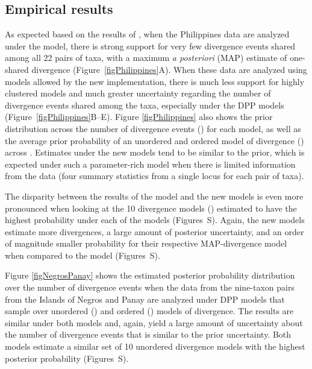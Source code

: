 \subsection{Empirical results}
As expected based on the results of \cite{Oaks2012}, when the Philippines data
are analyzed under the \empModelOld model, there is strong support for very few
divergence events shared among all 22 pairs of taxa, with a maximum \emph{a
posteriori} (MAP) estimate of one-shared divergence
(Figure~\ref{figPhilippines}A).
When these data are analyzed using models allowed by the new implementation,
there is much less support for highly clustered models and much greater
uncertainty regarding the number of divergence events shared among the taxa,
especially under the DPP models (Figure~\ref{figPhilippines}B--E).
Figure \ref{figPhilippines} also shows the prior distribution across the number
of divergence events (\divTimeNum) for each model, as well as the
average prior probability of an unordered and ordered model of divergence
(\divTimeIndexVector) across \divTimeNum.
Estimates under the new models tend to be similar to the prior, which is
expected under such a parameter-rich model when there is limited information
from the data (four summary statistics from a single locus for each pair of
taxa).

The disparity between the results of the \empModelOld model and the new models
is even more pronounced when looking at the 10 divergence models
(\divTimeIndexVector) estimated to have the highest probability under each of the
models
(Figures~S).
Again, the new models estimate more divergences, a large amount of posterior
uncertainty, and an order of magnitude smaller probability for their respective
MAP-divergence model when compared to the \empModelOld model
(Figures~S).

Figure \ref{figNegrosPanay} shows the estimated posterior probability
distribution over the number of divergence events when the data from the
nine-taxon pairs from the Islands of Negros and Panay are analyzed under DPP
models that sample over unordered (\npModelDPP) and ordered
(\npModelDPPOrdered) models of divergence.
The results are similar under both models and, again, yield a large amount of
uncertainty about the number of divergence events that is similar to the prior
uncertainty.
Both models estimate a similar set of 10 unordered divergence models with the
highest posterior probability
(Figures~S).

